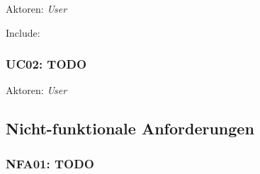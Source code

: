 Aktoren: \emph{User}

Include: 


\subsubsection{UC02: TODO}
\label{Use Cases:UC02}

Aktoren: \emph{User}



\subsection{Nicht-funktionale Anforderungen}
\label{Anforderungsspezifikation:Nicht-funktionale Anforderungen}

\subsubsection{NFA01: TODO}
\label{NFA:NFA01}



